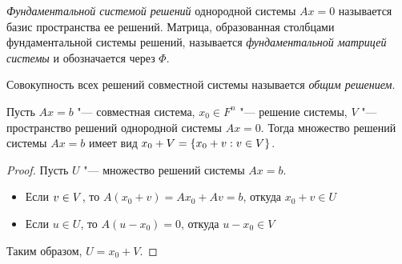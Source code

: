     \begin{definition}
    	\textit{Фундаментальной системой решений} однородной системы $Ax = 0$ называется базис пространства ее решений. Матрица, образованная столбцами фундаментальной системы решений, называется \textit{фундаментальной матрицей системы} и обозначается через $\Phi$.
    \end{definition}
    
    \begin{definition}
        Совокупность всех решений совместной системы называется \textit{общим решением}.
    \end{definition}
    
    \begin{proposition}
    	Пусть $Ax = b$ "--- совместная система, $x_0 \in F^n$ "--- решение системы, $V$ "--- пространство решений однородной системы $Ax = 0$. Тогда множество решений системы $Ax = b$ имеет вид $x_0 + V \hm{=} \{x_0 + v: v \in V\}$.
    \end{proposition}
    
    \begin{proof}
    	Пусть $U$ "--- множество решений системы $Ax = b$.
    	\begin{itemize}
    		\item Если $v \hm{\in} V$, то $A(x_0 + v) = Ax_0 + Av = b$, откуда $x_0 + v \in U$
    		\item Если $u \in U$, то $A(u - x_0) = 0$, откуда $u - x_0 \in V$
    	\end{itemize}
    
    	Таким образом, $U = x_0 + V$.
    \end{proof}